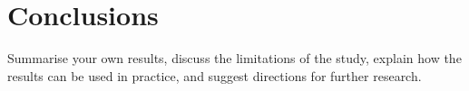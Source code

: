\chapter{Conclusions}

Summarise your own results, discuss the limitations of the study, explain how the results can be used in practice, and suggest directions for further research.
